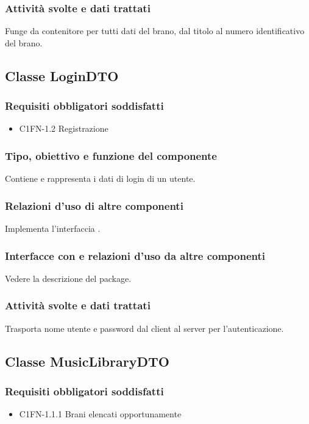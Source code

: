 \subsubsection*{Attivit\`a svolte e dati trattati}
Funge da contenitore per tutti dati del brano, dal titolo al numero
identificativo del brano. 

\subsection{Classe LoginDTO}
\subsubsection*{Requisiti obbligatori soddisfatti}
\begin{itemize}
	\item C1FN-1.2 Registrazione
\end{itemize}
\subsubsection*{Tipo, obiettivo e funzione del componente}
Contiene e rappresenta i dati di login di un utente.
\subsubsection*{Relazioni d'uso di altre componenti}
Implementa l'interfaccia .
\subsubsection*{Interfacce con e relazioni d'uso da altre componenti}
Vedere la descrizione del package.
\subsubsection*{Attivit\`a svolte e dati trattati}
Trasporta nome utente e password dal client al server per l'autenticazione.

\subsection{Classe MusicLibraryDTO}
\subsubsection*{Requisiti obbligatori soddisfatti}
\begin{itemize}
	\item C1FN-1.1.1 Brani elencati opportunamente
\end{itemize}
